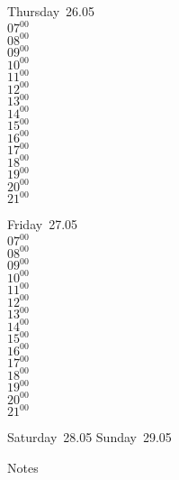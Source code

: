 \documentclass[11pt,a4paper]{book}\usepackage[]{graphicx}\usepackage[]{color}
\begin{document}
\clearpage
\begin{headerbox}
\end{headerbox}
\begin{weekdaybox}
  Thursday~26.05\\
  { 
  \vfill
  $07^{00}$\\
$08^{00}$\\
$09^{00}$\\
$10^{00}$\\
$11^{00}$\\
$12^{00}$\\
$13^{00}$\\
$14^{00}$\\
$15^{00}$\\
$16^{00}$\\
$17^{00}$\\
$18^{00}$\\
$19^{00}$\\
$20^{00}$\\
$21^{00}$\\
  }
\end{weekdaybox} 
\begin{weekdaybox}
  Friday~27.05\\
  { 
  \vfill
  $07^{00}$\\
$08^{00}$\\
$09^{00}$\\
$10^{00}$\\
$11^{00}$\\
$12^{00}$\\
$13^{00}$\\
$14^{00}$\\
$15^{00}$\\
$16^{00}$\\
$17^{00}$\\
$18^{00}$\\
$19^{00}$\\
$20^{00}$\\
$21^{00}$\\
  }
\end{weekdaybox}
\begin{weekendbox}
  Saturday~28.05
  \tcblower
  Sunday~29.05
\end{weekendbox} %
\begin{notebox}
  Notes
\end{notebox}
\clearpage
\end{document}
